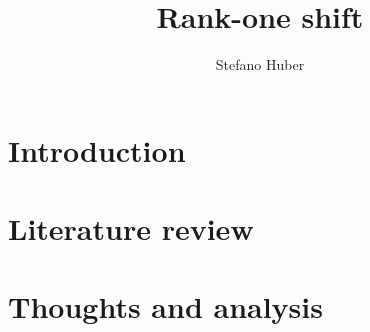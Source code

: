 \documentclass[]{article}
\title{Rank-one shift}
\author{Stefano Huber}
\begin{document}
\maketitle

\begin{abstract}

\end{abstract}

\section{Introduction}


\section{Literature review}
\label{sec:literature_review}


\section{Thoughts and analysis}
\label{sec:thoughts_and_analysis}




\end{document}
